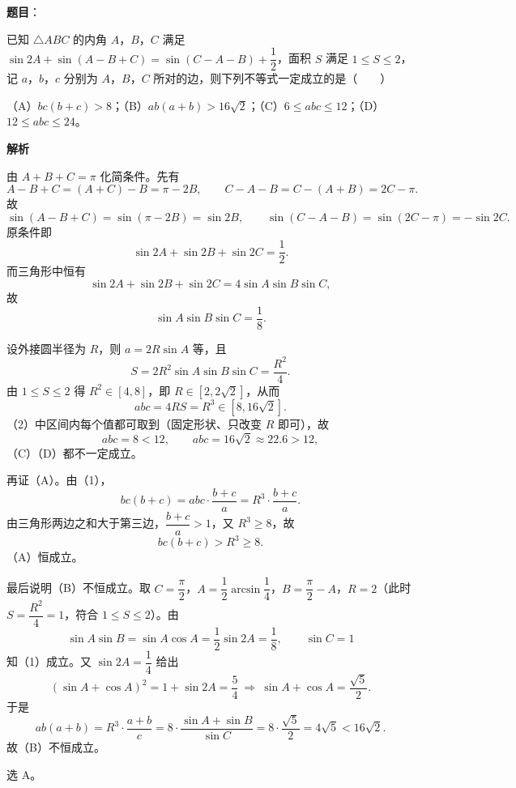 \begin{answer}

\textbf{题目}：

已知 $\triangle ABC$ 的内角 $A$，$B$，$C$ 满足 $\sin 2A+\sin(A-B+C)=\sin(C-A-B)+\dfrac12$，面积 $S$ 满足 $1\leqslant S\leqslant 2$，记 $a$，$b$，$c$ 分别为 $A$，$B$，$C$ 所对的边，则下列不等式一定成立的是\mbox{（　　）}

（A）$bc(b+c)>8$；（B）$ab(a+b)>16\sqrt2$；（C）$6\leqslant abc\leqslant 12$；（D）$12\leqslant abc\leqslant 24$。

\textbf{解析}

由 $A+B+C=\pi$ 化简条件。先有
\nopagebreak[4]
\[A-B+C=(A+C)-B=\pi-2B,\qquad C-A-B=C-(A+B)=2C-\pi .\]
故
\nopagebreak[4]
\[\sin(A-B+C)=\sin(\pi-2B)=\sin2B,\qquad \sin(C-A-B)=\sin(2C-\pi)=-\sin2C .\]
原条件即
\nopagebreak[4]
\[\sin2A+\sin2B+\sin2C=\frac12 .\]
而三角形中恒有
\nopagebreak[4]
\[\sin2A+\sin2B+\sin2C=4\sin A\sin B\sin C,\]
故
\nopagebreak[4]
\[\sin A\sin B\sin C=\frac18 . \tag{1}\]

设外接圆半径为 $R$，则 $a=2R\sin A$ 等，且
\nopagebreak[4]
\[S=2R^2\sin A\sin B\sin C=\frac{R^2}4 .\]
由 $1\leqslant S\leqslant2$ 得 $R^2\in[4,8]$，即 $R\in[2,2\sqrt2]$，从而
\nopagebreak[4]
\[abc=4RS=R^3\in[8,16\sqrt2]. \tag{2}\]
（2）中区间内每个值都可取到（固定形状、只改变 $R$ 即可），故
\nopagebreak[4]
\[abc=8<12,\qquad abc=16\sqrt2\approx22.6>12,\]
（C）（D）都不一定成立。

再证（A）。由（1），
\nopagebreak[4]
\[bc(b+c)=abc\cdot\frac{b+c}a=R^3\cdot\frac{b+c}a .\]
由三角形两边之和大于第三边，$\dfrac{b+c}a>1$，又 $R^3\geqslant8$，故
\nopagebreak[4]
\[bc(b+c)>R^3\geqslant8 .\]
（A）恒成立。

最后说明（B）不恒成立。取 $C=\dfrac\pi2$，$A=\dfrac12\arcsin\dfrac14$，$B=\dfrac\pi2-A$，$R=2$（此时 $S=\dfrac{R^2}4=1$，符合 $1\leqslant S\leqslant2$）。由
\nopagebreak[4]
\[\sin A\sin B=\sin A\cos A=\frac12\sin2A=\frac18,\qquad \sin C=1\]
知（1）成立。又 $\sin 2A=\dfrac14$ 给出
\nopagebreak[4]
\[(\sin A+\cos A)^2=1+\sin2A=\frac54\ \Longrightarrow\ \sin A+\cos A=\frac{\sqrt5}2 .\]
于是
\nopagebreak[4]
\[ab(a+b)=R^3\cdot\frac{a+b}c=8\cdot\frac{\sin A+\sin B}{\sin C}=8\cdot\frac{\sqrt5}2=4\sqrt5<16\sqrt2 .\]
故（B）不恒成立。

选 A。


\end{answer}
